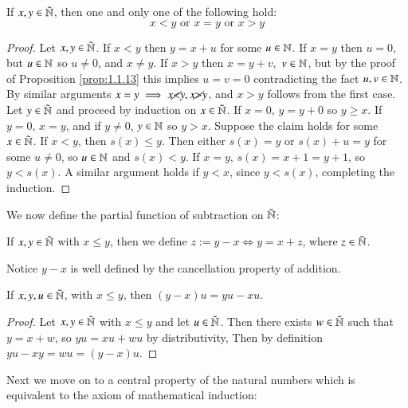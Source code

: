 \begin{proposition}[Trichotomy]\label{prop:1.1.14}
    If $x,y \in \tilde{\mathbb N}$, then one and only one of the following hold: $$x < y \text{ or } x = y \text{ or } x > y$$
\end{proposition}
\begin{proof}
    Let $x,y \in \tilde{\mathbb N}$. If $x < y$ then $y = x+u$ for some $u \in \mathbb N$. If $x =y$ then $u = 0$, but $u \in \mathbb N$ so $u \neq 0$, and $x \neq y$. If $x > y$ then $x = y+v,$ $v \in \mathbb N$, but by the proof of Proposition \ref{prop:1.1.13} this implies $u=v=0$ contradicting the fact $u,v \in \mathbb N$. By similar arguments $x =y \implies x \cancel{<} y, x \cancel{>} y$, and $x > y$ follows from the first case. Let $y \in \tilde{\mathbb N}$ and proceed by induction on $x \in \tilde{\mathbb N}$. If $x = 0$, $y = y+0$ so $y \geq x$. If $y = 0$, $x = y$, and if $y \neq 0$, $y \in \mathbb N$ so $y > x$. Suppose the claim holds for some $x \in \tilde{\mathbb N}$. If $x < y$, then $s(x) \leq y$. Then either $s(x) = y$ or $s(x) + u = y$ for some $u \neq 0$, so $u \in \mathbb N$ and $s(x) < y$. If $x = y$, $s(x) = x+1 = y+1$, so $y < s(x)$. A similar argument holds if $y < x$, since $y < s(x)$, completing the induction.
\end{proof}

We now define the partial function of subtraction on $\tilde{\mathbb N}$:

\begin{definition}
    If $x,y \in \tilde{\mathbb N}$ with $x \leq y$, then we define $z := y-x \iff y = x+z$, where $z \in \tilde{\mathbb N}$.
\end{definition}
Notice $y-x$ is well defined by the cancellation property of addition.

\begin{proposition}\label{prop:1.1.17}
    If $x,y,u \in \tilde{\mathbb N}$, with $x \leq y$, then $(y-x)u = yu-xu$.
\end{proposition}
\begin{proof}
    Let $x,y \in \tilde{\mathbb N}$ with $x \leq y$ and let $u \in \tilde{\mathbb N}$. Then there exists $w \in \tilde{\mathbb N}$ such that $y = x+w$, so $yu = xu+wu$ by distributivity, Then by definition $yu - xy = wu = (y-x)u$.
\end{proof}

Next we move on to a central property of the natural numbers which is equivalent to the axiom of mathematical induction:

